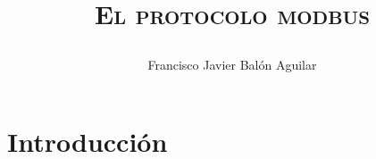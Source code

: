 \documentclass[11pt, twosides, titlepage]{article}
\title{{\scshape\Huge El protocolo modbus \par}}
\author{Francisco Javier Balón Aguilar}
\begin{document}
\maketitle
\renewcommand{\contentsname}{Índice de contenidos} %
\tableofcontents %
\newpage

\listoffigures
\newpage

\listoftables
\newpage

\section{Introducción}
\end{document}
